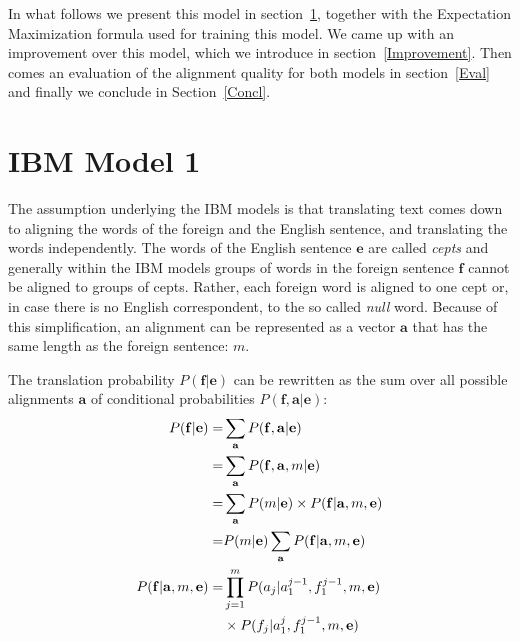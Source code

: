 \documentclass[11pt]{article}
\renewcommand{\vec}[1]{\mathbf{#1}}
\begin{document}
In what follows we present this model in section~\ref{IBM1}, together with the Expectation Maximization formula used for training this model. We came up with an improvement over this model, which we introduce in section~\ref{Improvement}. Then comes an evaluation of the alignment quality for both models in section~\ref{Eval} and finally we conclude in Section~\ref{Concl}.




\section{IBM Model 1}
\label{IBM1}

The assumption underlying the IBM models is that translating text comes down to aligning the words 
of the foreign and the English sentence, and translating the words independently.
The words of the English sentence $\vec{e}$ are called \textit{cepts} and generally within the IBM models groups of  words in the foreign sentence $\vec{f}$ cannot be aligned to groups of cepts.  Rather, each foreign word  is aligned to one cept or, in case there is no English correspondent, to the so called \textit{null} word.
Because of this simplification, an alignment can be represented as a vector $\vec{a}$ that has the same length as the foreign sentence: $m$.

The translation probability $P(\vec{f}|\vec{e})$ can be rewritten as the sum over all possible alignments $\vec{a}$ of conditional probabilities $P(\vec{f}, \vec{a}|\vec{e})$:
\begin{align}
P(\vec{f}|\vec{e}) =& \sum_\vec{a} P(\vec{f},\vec{a}|\vec{e})\notag\\
=&\sum_\vec{a}  P(\vec{f},\vec{a},m|\vec{e}) \notag\\
=&\sum_\vec{a}  P(m|\vec{e})\times P(\vec{f}|\vec{a},m,\vec{e})\notag\\
=&  P(m|\vec{e}) \sum_\vec{a} P(\vec{f}|\vec{a},m,\vec{e})\\
P(\vec{f}|\vec{a},m,\vec{e})=&\prod_{j=1}^{m} P(a_j|a_1^{j-1}, f_1^{j-1}, m, \vec{e}) \notag \\
& \times  P(f_j|a_1^j,f_1^{j-1},m,\vec{e})\label{p(f|a,m,e)}
\end{align}


\end{document}
